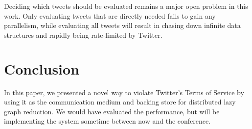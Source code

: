 \documentclass{sigplanconf}
\begin{document}
Deciding which tweets should be evaluated remains a major open problem
in this work. Only evaluating tweets that are directly needed fails to
gain any parallelism, while evaluating all tweets will result in
chasing down infinite data structures and rapidly being rate-limited
by Twitter.


\section{Conclusion}
In this paper, we presented a novel way to violate Twitter's Terms of
Service \cite{twitterTOS} by using it as the communication medium and
backing store for distributed lazy graph reduction.
We would have evaluated the performance, but will be implementing the
system sometime between now and the conference.


{}

\end{document}
